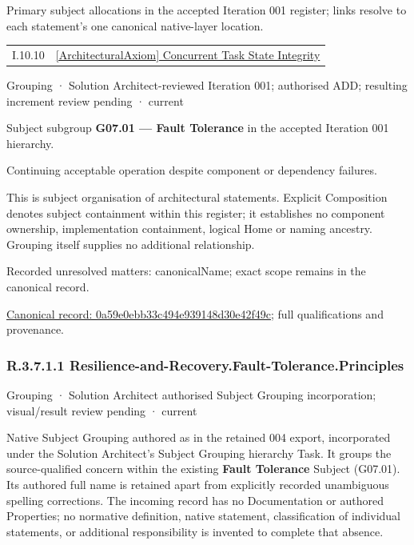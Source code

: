 Primary subject allocations in the accepted Iteration 001 register; links resolve to each statement’s one canonical native-layer location.\par
\begin{longtable}{p{.22\linewidth}p{.73\linewidth}}
I.10.10 & \hyperref[element:26f3759e1d014a7cae5f265ea6530000]{[ArchitecturalAxiom] Concurrent Task State Integrity} \\
\end{longtable}
\label{element:0a59e0ebb33c494e939148d30e42f49c}
{\small Grouping · Solution Architect-reviewed Iteration 001; authorised ADD; resulting increment review pending · current}\par

Subject subgroup \textbf{G07.01 — Fault Tolerance} in the accepted Iteration 001 hierarchy.



Continuing acceptable operation despite component or dependency failures.



This is subject organisation of architectural statements. Explicit Composition denotes subject containment within this register; it establishes no component ownership, implementation containment, logical Home or naming ancestry. Grouping itself supplies no additional relationship.


{\small Recorded unresolved matters: canonicalName; exact scope remains in the canonical record.}\par
{\footnotesize \href{../../../../continuum/grouping/0a59e0ebb33c494e939148d30e42f49c.md}{Canonical record: 0a59e0ebb33c494e939148d30e42f49c}; full qualifications and provenance.}\par
\subsubsection*{R.3.7.1.1 Resilience-and-Recovery.Fault-Tolerance.Principles}
\label{navigation:R.3.7.1.1}

\label{element:3566f7776b8741699f48139e1c6b8ec8}
{\small Grouping · Solution Architect authorised Subject Grouping incorporation; visual/result review pending · current}\par

Native Subject Grouping authored as \texttt{} in the retained 004 export,
incorporated under the Solution Architect's Subject Grouping hierarchy Task.
It groups the source-qualified \texttt{} concern within
the existing \textbf{Fault Tolerance} Subject (G07.01). Its authored full name
is retained apart from explicitly recorded unambiguous spelling corrections.
The incoming record has no Documentation or authored Properties; no normative
definition, native statement, classification of individual statements, or
additional responsibility is invented to complete that absence.




